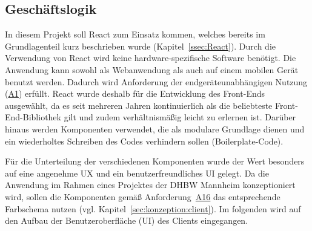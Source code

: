 
\subsection{Geschäftslogik}
\label{ssec:GeschaeftslogikClient}

In diesem Projekt soll React zum Einsatz kommen, welches bereits im Grundlagenteil kurz beschrieben wurde (Kapitel~\vref{ssec:React}).
Durch die Verwendung von React wird keine hardware-spezifische Software benötigt.
Die Anwendung kann sowohl als Webanwendung als auch auf einem mobilen Gerät benutzt werden.
Dadurch wird Anforderung der endgeräteunabhängigen Nutzung (\hyperref[Anf:A1]{A1}) erfüllt.
React wurde \ua deshalb für die Entwicklung des Front-Ends ausgewählt, da es seit mehreren Jahren kontinuierlich als die beliebteste Front-End-Bibliothek gilt\autocite[Vgl.][]{stackoverflow_Top_Frameworks} und zudem verhältnismäßig leicht zu erlernen ist.
Darüber hinaus werden Komponenten verwendet, die als modulare Grundlage dienen und ein wiederholtes Schreiben des Codes verhindern sollen (Boilerplate-Code).


Für die Unterteilung der verschiedenen Komponenten wurde der Wert besonders auf eine angenehme \acf{UX} und ein benutzerfreundliches \acf{UI} gelegt.
Da die Anwendung im Rahmen eines Projektes der \acs{DHBW} Mannheim konzeptioniert wird, sollen die Komponenten gemäß Anforderung~\hyperref[Anf:A16]{A16} das entsprechende Farbschema nutzen (vgl. Kapitel~\vref{sec:konzeption:client}).
Im folgenden wird auf den Aufbau der Benutzeroberfläche (\ac{UI}) des Clients eingegangen.
